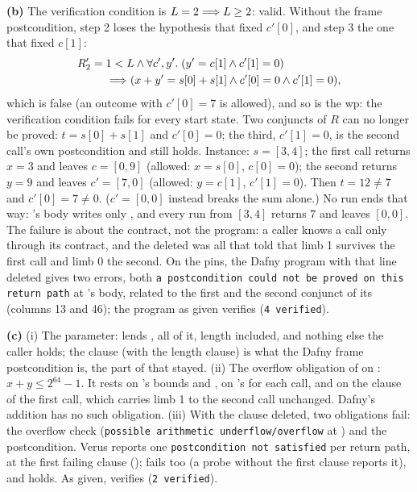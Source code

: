 \documentclass[11pt]{article}
\begin{document}
\textbf{(b)} The verification condition is $L = 2 \Longrightarrow L \geq 2$: valid.
Without the frame postcondition, step 2 loses the hypothesis that fixed
$c'[0]$, and step 3 the one that fixed $c[1]$:
\[ \begin{aligned} R_2' = {} & 1 < L \wedge \forall c', y' .\; (y' = c[1] \wedge c'[1] = 0) \\
   & \Longrightarrow (x + y' = s[0] + s[1] \wedge c'[0] = 0 \wedge c'[1] = 0), \end{aligned} \]
which is false (an outcome with $c'[0] = 7$ is allowed), and so is the wp: the
verification condition fails for every start state. Two conjuncts of $R$ can
no longer be proved: $t = s[0] + s[1]$ and $c'[0] = 0$; the third,
$c'[1] = 0$, is the second call's own postcondition and still holds.
Instance: $s = [3, 4]$; the first call returns $x = 3$ and leaves $c = [0, 9]$
(allowed: $x = s[0]$, $c[0] = 0$); the second returns $y = 9$ and leaves
$c' = [7, 0]$ (allowed: $y = c[1]$, $c'[1] = 0$). Then $t = 12 \neq 7$ and
$c'[0] = 7 \neq 0$. ($c' = [0, 0]$ instead breaks the sum alone.) No run ends
that way: 's body writes only , and every run from
$[3, 4]$ returns $7$ and leaves $[0, 0]$. The failure is about the contract,
not the program: a caller knows a call only through its contract, and the
deleted  was all that told  that limb 1 survives the
first call and limb 0 the second. On the pins, the Dafny program with that
line deleted gives two errors, both \texttt{a postcondition could not be
proved on this return path} at 's body, related to the first and
the second conjunct of its  (columns 13 and 46); the program as
given verifies (\texttt{4 verified}).

\textbf{(c)} (i) The  parameter:  lends
, all of it, length included, and nothing else the caller holds; the
 clause (with the length clause) is what the Dafny frame
postcondition is, the part of  that stayed. (ii) The overflow
obligation of  on : $x + y \leq 2^{64} - 1$. It rests on
's bounds  and ,
on 's  for each call, and on the
 clause of the first call, which carries limb 1 to the second call
unchanged. Dafny's  addition has no such obligation. (iii) With the
 clause deleted, two obligations fail: the overflow check
(\texttt{possible arithmetic underflow/overflow} at ) and the
postcondition. Verus reports one \texttt{postcondition not satisfied} per
return path, at the first failing clause ();
 fails too (a probe without the first clause reports
it), and  holds. As given,  verifies
(\texttt{2 verified}).
\end{document}
